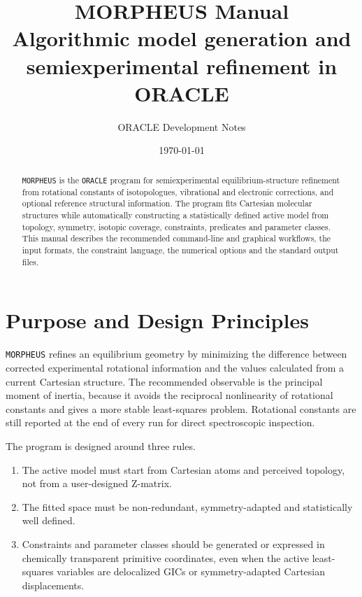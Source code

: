\documentclass[11pt]{article}
\title{\textbf{MORPHEUS Manual}\\
\large Algorithmic model generation and semiexperimental refinement in ORACLE}
\author{ORACLE Development Notes}
\date{\today}
\newcommand{\program}{\texttt{MORPHEUS}}
\newcommand{\oracle}{\texttt{ORACLE}}
\begin{document}
\maketitle

\begin{abstract}
\program{} is the \oracle{} program for semiexperimental equilibrium-structure
refinement from rotational constants of isotopologues, vibrational and
electronic corrections, and optional reference structural information.  The
program fits Cartesian molecular structures while automatically constructing a
statistically defined active model from topology, symmetry, isotopic coverage,
constraints, predicates and parameter classes.  This manual describes the
recommended command-line and graphical workflows, the input formats, the
constraint language, the numerical options and the standard output files.
\end{abstract}

\tableofcontents
\newpage

\section{Purpose and Design Principles}

\program{} refines an equilibrium geometry by minimizing the difference between
corrected experimental rotational information and the values calculated from a
current Cartesian structure.  The recommended observable is the principal
moment of inertia, because it avoids the reciprocal nonlinearity of rotational
constants and gives a more stable least-squares problem.  Rotational constants
are still reported at the end of every run for direct spectroscopic inspection.

The program is designed around three rules.

\begin{enumerate}
  \item The active model must start from Cartesian atoms and perceived topology,
        not from a user-designed Z-matrix.
  \item The fitted space must be non-redundant, symmetry-adapted and
        statistically well defined.
  \item Constraints and parameter classes should be generated or expressed in
        chemically transparent primitive coordinates, even when the active
        least-squares variables are delocalized GICs or symmetry-adapted
        Cartesian displacements.
\end{enumerate}
\end{document}
